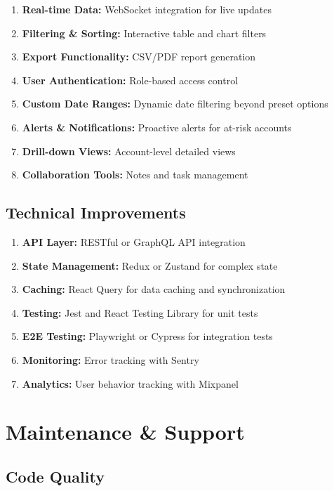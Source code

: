 \documentclass[12pt,a4paper]{article}
\begin{document}
\begin{enumerate}
    \item \textbf{Real-time Data:} WebSocket integration for live updates
    \item \textbf{Filtering \& Sorting:} Interactive table and chart filters
    \item \textbf{Export Functionality:} CSV/PDF report generation
    \item \textbf{User Authentication:} Role-based access control
    \item \textbf{Custom Date Ranges:} Dynamic date filtering beyond preset options
    \item \textbf{Alerts \& Notifications:} Proactive alerts for at-risk accounts
    \item \textbf{Drill-down Views:} Account-level detailed views
    \item \textbf{Collaboration Tools:} Notes and task management
\end{enumerate}

\subsection{Technical Improvements}

\begin{enumerate}
    \item \textbf{API Layer:} RESTful or GraphQL API integration
    \item \textbf{State Management:} Redux or Zustand for complex state
    \item \textbf{Caching:} React Query for data caching and synchronization
    \item \textbf{Testing:} Jest and React Testing Library for unit tests
    \item \textbf{E2E Testing:} Playwright or Cypress for integration tests
    \item \textbf{Monitoring:} Error tracking with Sentry
    \item \textbf{Analytics:} User behavior tracking with Mixpanel
\end{enumerate}

\section{Maintenance \& Support}

\subsection{Code Quality}
\end{document}
